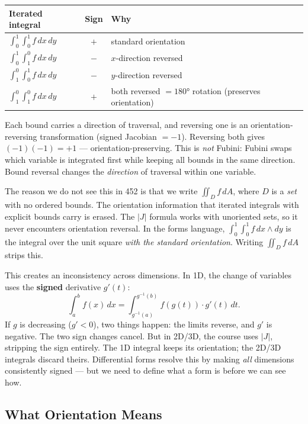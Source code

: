 \documentclass[11pt]{report}
\begin{document}
\begin{center}
\renewcommand{\arraystretch}{1.4}
\begin{tabular}{|l|c|l|}
\hline
\textbf{Iterated integral} & \textbf{Sign} & \textbf{Why} \\
\hline
$\int_0^1\!\int_0^1 f\,dx\,dy$ & $+$ & standard orientation \\
\hline
$\int_0^1\!\int_1^0 f\,dx\,dy$ & $-$ & $x$-direction reversed \\
\hline
$\int_1^0\!\int_0^1 f\,dx\,dy$ & $-$ & $y$-direction reversed \\
\hline
$\int_1^0\!\int_1^0 f\,dx\,dy$ & $+$ & both reversed $= 180°$ rotation (preserves orientation) \\
\hline
\end{tabular}
\end{center}

Each bound carries a direction of traversal, and reversing one is an orientation-reversing transformation (signed Jacobian $= -1$). Reversing both gives $(-1)(-1) = +1$ --- orientation-preserving. This is \textit{not} Fubini: Fubini swaps which variable is integrated first while keeping all bounds in the same direction. Bound reversal changes the \textit{direction} of traversal within one variable.

The reason we do not see this in 452 is that we write $\iint_D f\,dA$, where $D$ is a \textit{set} with no ordered bounds. The orientation information that iterated integrals with explicit bounds carry is erased. The $|J|$ formula works with unoriented sets, so it never encounters orientation reversal. In the forms language, $\int_0^1\!\int_0^1 f\,dx \wedge dy$ is the integral over the unit square \textit{with the standard orientation}. Writing $\iint_D f\,dA$ strips this.

This creates an inconsistency across dimensions. In 1D, the change of variables uses the \textbf{signed} derivative $g'(t)$:
\[
\int_a^b f(x)\,dx = \int_{g^{-1}(a)}^{g^{-1}(b)} f(g(t)) \cdot g'(t)\,dt.
\]
If $g$ is decreasing ($g' < 0$), two things happen: the limits reverse, and $g'$ is negative. The two sign changes cancel. But in 2D/3D, the course uses $|J|$, stripping the sign entirely. The 1D integral keeps its orientation; the 2D/3D integrals discard theirs. Differential forms resolve this by making \textit{all} dimensions consistently signed --- but we need to define what a form is before we can see how.

\subsection{What Orientation Means}
\end{document}
